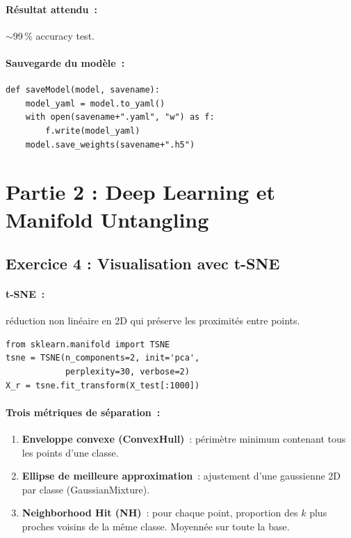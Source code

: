 \documentclass[a4paper,11pt]{article}
\theoremstyle{definition}
\theoremstyle{remark}
\begin{document}
\paragraph{R\'esultat attendu~:} $\sim$99\,\% accuracy test.

\paragraph{Sauvegarde du mod\`ele~:}
\begin{lstlisting}
def saveModel(model, savename):
    model_yaml = model.to_yaml()
    with open(savename+".yaml", "w") as f:
        f.write(model_yaml)
    model.save_weights(savename+".h5")
\end{lstlisting}

\section{Partie 2 : Deep Learning et Manifold Untangling}

\subsection{Exercice 4 : Visualisation avec t-SNE}

\paragraph{t-SNE~:} r\'eduction non lin\'eaire en 2D qui pr\'eserve
les proximit\'es entre points.

\begin{lstlisting}
from sklearn.manifold import TSNE
tsne = TSNE(n_components=2, init='pca',
            perplexity=30, verbose=2)
X_r = tsne.fit_transform(X_test[:1000])
\end{lstlisting}

\paragraph{Trois m\'etriques de s\'eparation~:}
\begin{enumerate}
  \item \textbf{Enveloppe convexe (ConvexHull)}~: p\'erim\`etre
    minimum contenant tous les points d'une classe.
  \item \textbf{Ellipse de meilleure approximation}~: ajustement
    d'une gaussienne 2D par classe (GaussianMixture).
  \item \textbf{Neighborhood Hit (NH)}~: pour chaque point,
    proportion des $k$ plus proches voisins de la m\^{e}me classe.
    Moyenn\'ee sur toute la base.
\end{enumerate}
\end{document}
